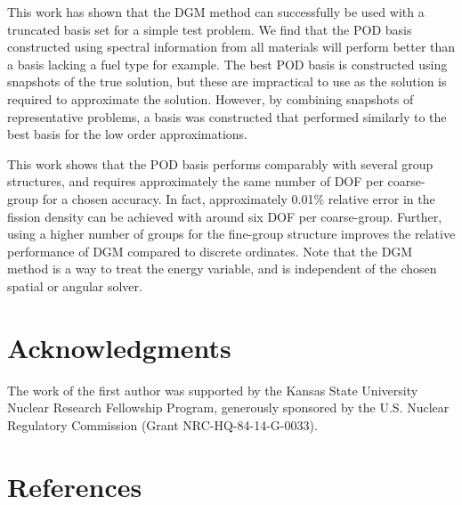 \documentclass[5p,times,twocolumn,10pt]{elsarticle}
\begin{document}
    This work has shown that the DGM method can successfully be used with a truncated basis set for a simple test problem.
    We find that the POD basis constructed using spectral information from all materials will perform better than a basis lacking a fuel type for example.
    The best POD basis is constructed using snapshots of the true solution, but these are impractical to use as the solution is required to approximate the solution.
    However, by combining snapshots of representative problems, a basis was constructed that performed similarly to the best basis for the low order approximations.

    This work shows that the POD basis performs comparably with several group structures, and requires approximately the same number of DOF per coarse-group for a chosen accuracy.
    In fact, approximately 0.01\% relative error in the fission density can be achieved with around six DOF per coarse-group.
    Further, using a higher number of groups for the fine-group structure improves the relative performance of DGM compared to discrete ordinates.
    Note that the DGM method is a way to treat the energy variable, and is independent of the chosen spatial or angular solver.

    \section{Acknowledgments}
    The work of the first author was supported by the Kansas State University Nuclear Research Fellowship Program, generously sponsored by the U.S. Nuclear Regulatory Commission (Grant NRC-HQ-84-14-G-0033).

    \section{References}
    
    

    \appendix
    \onecolumn
\end{document}
